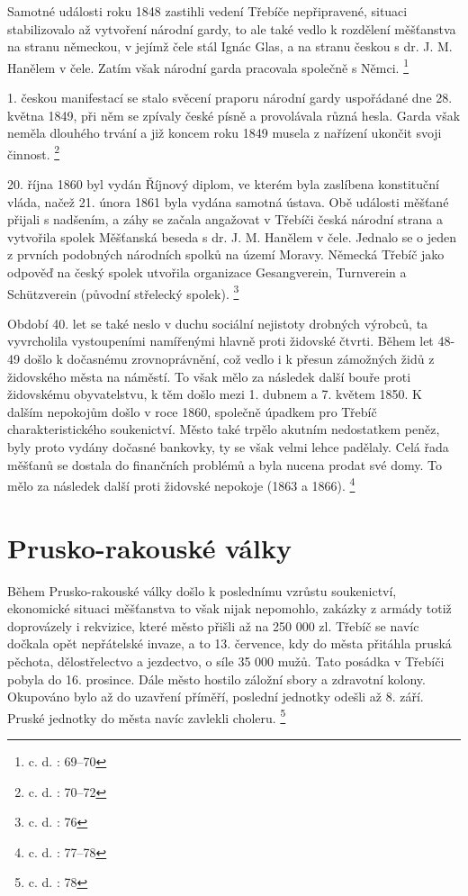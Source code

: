 \documentclass[a4paper,oneside,12p]{report}
\begin{document}
Samotné události roku 1848 zastihli vedení Třebíče nepřipravené, situaci stabilizovalo až vytvoření národní gardy, to ale také vedlo k rozdělení měšťanstva na stranu německou, v jejímž čele stál Ignác Glas, a na stranu českou s dr. J. M. Hanělem v čele.
Zatím však národní garda pracovala společně s Němci. \footnote{c. d. : 69--70}

1. českou manifestací se stalo svěcení praporu národní gardy uspořádané dne 28. května 1849, při něm se zpívaly české písně a provolávala různá hesla.
Garda však neměla dlouhého trvání a již koncem roku 1849 musela z nařízení ukončit svoji činnost. \footnote{c. d. : 70--72}

20. října 1860 byl vydán Říjnový diplom, ve kterém byla zaslíbena konstituční vláda, načež 21. února 1861 byla vydána samotná ústava.
Obě události měšťané přijali s nadšením, a záhy se začala angažovat v Třebíči česká národní strana a vytvořila spolek Měšťanská beseda s dr. J. M. Hanělem v čele.
Jednalo se o jeden z prvních podobných národních spolků na území Moravy.
Německá Třebíč jako odpověď na český spolek utvořila organizace Gesangverein, Turnverein a Schützverein (původní střelecký spolek). \footnote{c. d. : 76}

Období 40. let se také neslo v duchu sociální nejistoty drobných výrobců, ta vyvrcholila vystoupeními namířenými hlavně proti židovské čtvrti.
Během let 48-49 došlo k dočasnému zrovnoprávnění, což vedlo i k přesun zámožných židů z židovského města na náměstí.
To však mělo za následek další bouře proti židovskému obyvatelstvu, k těm došlo mezi 1. dubnem a 7. květem 1850.
K dalším nepokojům došlo v roce 1860, společně úpadkem pro Třebíč charakteristického soukenictví.
Město také trpělo akutním nedostatkem peněz, byly proto vydány dočasné bankovky, ty se však velmi lehce padělaly.
Celá řada měšťanů se dostala do finančních problémů a byla nucena prodat své domy.
To mělo za následek další proti židovské nepokoje (1863 a 1866). \footnote{c. d. : 77--78}

\section{Prusko-rakouské války}

Během Prusko-rakouské války došlo k poslednímu vzrůstu soukenictví, ekonomické situaci měšťanstva to však nijak nepomohlo, zakázky z armády totiž doprovázely i rekvizice, které město přišli až na 250 000 zl.
Třebíč se navíc dočkala opět nepřátelské invaze, a to 13. července, kdy do města přitáhla pruská pěchota, dělostřelectvo a jezdectvo, o síle 35 000 mužů.
Tato posádka v Třebíči pobyla do 16. prosince.
Dále město hostilo záložní sbory a zdravotní kolony.
Okupováno bylo až do uzavření příměří, poslední jednotky odešli až 8. září.
Pruské jednotky do města navíc zavlekli choleru. \footnote{c. d. : 78}
\end{document}
